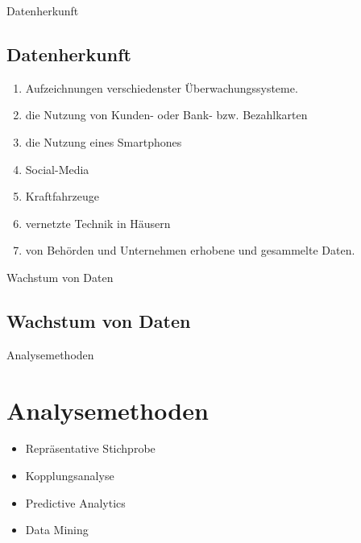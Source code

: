 \documentclass[11pt]{beamer}
\begin{document}
\begin{frame}{Datenherkunft}
\subsection{Datenherkunft}
\begin{enumerate}
\item Aufzeichnungen verschiedenster Überwachungssysteme.
\item die Nutzung von Kunden- oder Bank- bzw. Bezahlkarten 
\item die Nutzung eines Smartphones
\item Social-Media
\item Kraftfahrzeuge
\item vernetzte Technik in Häusern
\item von Behörden und Unternehmen erhobene und gesammelte Daten.
\end{enumerate}

\end{frame}

\begin{frame}{Wachstum von Daten}
\subsection{Wachstum von Daten}
	\begin{figure}
	\end{figure}
\end{frame}

\begin{frame}{Analysemethoden}
\section{Analysemethoden}
\begin{itemize}
\item Repräsentative Stichprobe
\item Kopplungsanalyse
\item Predictive Analytics
\item Data Mining
\end{itemize}
\end{frame}
\end{document}
